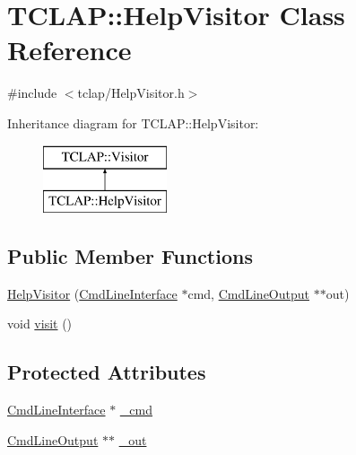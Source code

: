 \hypertarget{class_t_c_l_a_p_1_1_help_visitor}{}\section{T\+C\+L\+A\+P\+:\+:Help\+Visitor Class Reference}
\label{class_t_c_l_a_p_1_1_help_visitor}


{\ttfamily \#include $<$tclap/\+Help\+Visitor.\+h$>$}

Inheritance diagram for T\+C\+L\+A\+P\+:\+:Help\+Visitor\+:\begin{figure}[H]
\begin{center}
\leavevmode
\includegraphics[height=2.000000cm]{class_t_c_l_a_p_1_1_help_visitor}
\end{center}
\end{figure}
\subsection*{Public Member Functions}
\begin{DoxyCompactItemize}
\item 
\hyperlink{class_t_c_l_a_p_1_1_help_visitor_a425e96efa6950b1949f1f81d4ff133f1}{Help\+Visitor} (\hyperlink{class_t_c_l_a_p_1_1_cmd_line_interface}{Cmd\+Line\+Interface} $\ast$cmd, \hyperlink{class_t_c_l_a_p_1_1_cmd_line_output}{Cmd\+Line\+Output} $\ast$$\ast$out)
\item 
void \hyperlink{class_t_c_l_a_p_1_1_help_visitor_a157294efe254edb2b713b7c458aad3f2}{visit} ()
\end{DoxyCompactItemize}
\subsection*{Protected Attributes}
\begin{DoxyCompactItemize}
\item 
\hyperlink{class_t_c_l_a_p_1_1_cmd_line_interface}{Cmd\+Line\+Interface} $\ast$ \hyperlink{class_t_c_l_a_p_1_1_help_visitor_afc7e0402f4e09ab6eff91680ea87ea57}{\+\_\+cmd}
\item 
\hyperlink{class_t_c_l_a_p_1_1_cmd_line_output}{Cmd\+Line\+Output} $\ast$$\ast$ \hyperlink{class_t_c_l_a_p_1_1_help_visitor_ae12c2d2208b64377a6360fb335454877}{\+\_\+out}
\end{DoxyCompactItemize}


